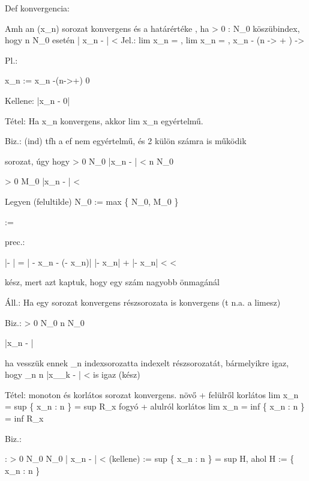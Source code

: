 Def konvergencia:

Amh an (x_n) sorozat konvergens és a határértéke \alpha , ha
\exists \epsilon > 0 : \forall N_0 \in {} köszübindex, hogy \forall n \geq N_0 esetén
| x_n - \alpha | < \epsilon
Jel.: lim x_n = \alpha, lim x_n = \alpha, x_n - (n -> + \infty) -> \alpha

Pl.:

x_n := 
x_n -(n->+\infty) 0

Kellene: |x_n - 0|

Tétel:
Ha x_n konvergens, akkor lim x_n egyértelmű.

Biz.: (ind)
tfh a ef nem egyértelmű, és 2 külön számra is működik

\exists sorozat, úgy hogy
\forall \epsilon > 0 \exists N_0 \in {} |x_n - \alpha | < \epsilon
\forall n \geq N_0

\forall \epsilon > 0 \exists M_0 \in {} |x_n - \beta | < 

Legyen
(felultilde) N_0 := max \{ N_0, M_0 \}

\epsilon := 

prec.:

|\alpha - \beta | = | \alpha - x_n - (\beta - x_n)| \leq |\alpha - x_n| + |\Beta - x_n| <
< \frac{}

kész, mert azt kaptuk, hogy egy szám nagyobb önmagánál

Áll.:
Ha egy sorozat konvergens \Roghtarrow \forall részsorozata is konvergens (t n.a. a limesz)

Biz.:
\forall \epsilon > 0 \exists N_0 \in {} \forall n \geq N_0

|x_n - \alpha | \epsilon

ha vesszük ennek \forall \nu_n indexsorozatta indexelt részsorozatát, bármelyikre igaz, hogy \nu_n \geq n
\Rightarrow |x_\nu_k - \Alpha | < \epsilon is igaz (kész)



Tétel:
\forall monoton és korlátos sorozat konvergens.
növő + felülről korlátos \RIghtarrow lim x_n = sup \{ x_n : n \in {} \} = sup R_x
fogyó + alulról korlátos \Rightarrow lim x_n = inf \{ x_n : n \in {} \} = inf R_x

Biz.:

\Exists \alpha : \forall \epsilon > 0
\exists N_0 \in {} \foralln \geq N_0 | x_n - \alpha| < \epsilon
(kellene) \alpha := sup \{ x_n : n \in {} \} = sup H, ahol H := \{ x_n : n \in {} \}


